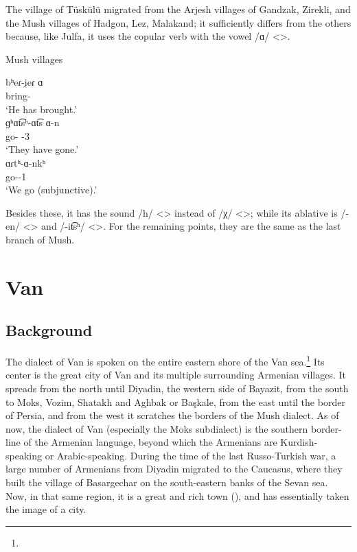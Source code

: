 The village of Tüskülü migrated from the Arjesh villages of Gandzak, Zirekli, and the Mush villages of Hadgon, Lez, Malakand; it sufficiently differs from the others because, like Julfa, it uses the copular verb with the vowel /ɑ/ <>.

\begin{exe}
	\ex Mush villages \label{sent:Mush:textSample:village:Aux}
	\begin{xlist}
		\ex \gll bʰeɾ-i̯eɾ ɑ \\
		bring-{\perfcvb} {\aux} \\
		\trans `He has brought.'\\
		\ex \gll ɡʰɑt͡sʰ-ɑt͡s ɑ-n \\
		go-{\rptcp} {\aux}-3{\pl} \\
		\trans `They have gone.'\\
		\ex \gll ɑɾtʰ-ɑ-nkʰ \\
		go-{\thgloss}-1{\pl} \\
		\trans `We go (subjunctive).'\\
		
	\end{xlist}
\end{exe}


Besides these, it has the sound /h/ <> instead of /χ/ <>; while its ablative is /-en/ <> and /-it͡sʰ/ <>. For the remaining points, they are the same as the last branch of Mush. 




\chapter{Van}\label{chapter:Van}

\section{Background}

\begin{adjarianpage}\label{page:140}\end{adjarianpage}%

The dialect of Van is spoken on the entire eastern shore of the Van sea.\footnote{} Its center is the great city of Van and its multiple surrounding Armenian villages. It spreads from the north until Diyadin, the western side of Bayazit, from the south to Moks, Vozim, Shatakh and Aghbak or Başkale, from the east until the border of Persia, and from the west it scratches the borders of the Mush dialect. As of now, the dialect of Van (especially the Moks subdialect) is the southern border-line of the Armenian language, beyond which the Armenians are Kurdish-speaking or Arabic-speaking. During the time of the last Russo-Turkish war, a large number of Armenians from Diyadin migrated to the Caucasus, where they built the village of Basargechar on the south-eastern banks of the Sevan sea. Now, in that same region, it is a great and rich town (), and has essentially taken the image of a city. 

